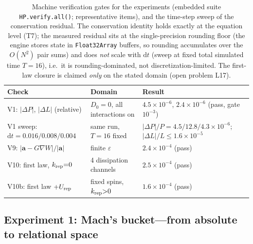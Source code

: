 \documentclass[aps,reprint,amsmath,amssymb,nofootinbib,superscriptaddress,floatfix]{revtex4-2}
\newcommand{\ud}{\mathrm{d}}
\newcommand{\vect}[1]{\bm{#1}}
\newcommand{\Dz}{D_0}
\begin{document}
\begin{table}[b]
\caption{\label{tab:verify}%
Machine verification gates for the experiments (embedded suite
\texttt{HP.verify.all()}; representative items), and the time-step
sweep of the conservation residual.
The conservation identity holds exactly at the equation level (T7);
the measured residual sits at the single-precision rounding floor (the
engine stores state in \texttt{Float32Array} buffers, so rounding
accumulates over the $O(N^2)$ pair sums) and
does \emph{not} scale with $\ud t$ (sweep at fixed total simulated
time $T = 16$), i.e.\ it is rounding-dominated, not
discretization-limited.
The first-law closure is claimed \emph{only} on the stated domain
(open problem L17).}
\begin{ruledtabular}
\begin{tabular}{lp{}p{}}
Check & Domain & Result \\
\hline
V1: $|\Delta P|$, $|\Delta L|$ (relative) &
$\Dz{=}0$, all interactions on & $4.5\times10^{-6}$,
$2.4\times10^{-6}$ (pass, gate $10^{-3}$) \\
V1 sweep: $\ud t{=}0.016/0.008/0.004$ &
same run, $T{=}16$ fixed & $|\Delta P|/P = 4.5/12.8/4.3
\times10^{-6}$; $|\Delta L|/L \le 1.6\times10^{-5}$ \\
V9: $|\vect{a}-G\nabla W|/|\vect{a}|$ &
finite $\varepsilon$ & $2.4\times10^{-4}$ (pass) \\
V10: first law, $k_{\rm rep}{=}0$ &
4 dissipation channels & $2.5\times10^{-4}$ (pass) \\
V10b: first law $+U_{\rm rep}$ &
fixed spins, $k_{\rm rep}{>}0$ & $1.6\times10^{-4}$ (pass) \\
\end{tabular}
\end{ruledtabular}
\end{table}

\subsection{Experiment 1: Mach's bucket---from absolute to relational
space}
\label{sec:exp1}
\end{document}
